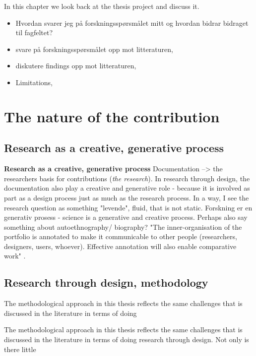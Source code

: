 In this chapter we look back at the thesis project and discuss it.

\begin{itemize}
    \item Hvordan svarer jeg på forskningsspørsmålet mitt og hvordan bidrar bidraget til fagfeltet?
    \item svare på forskningsspørsmålet opp mot litteraturen,
    \item diskutere findings opp mot litteraturen, 
    \item Limitations, 
\end{itemize}


\section{The nature of the contribution}



\subsection{Research as a creative, generative process}

\textbf{Research as a creative, generative process}
Documentation --> the researchers basis for contributions (\emph{the research}). In research through design, the documentation also play a creative and generative role - because it is involved as part as a design process just as much as the research process.
In a way, I see the research question as something "levende", fluid, that is not static. 
Forskning er en generativ prosess - science is a generative and creative process.
Perhaps also say something about autoethnography/ biography?
"The inner-organisation of the portfolio is annotated to make it communicable to other people (researchers, designers, users, whoever). Effective annotation will also enable comparative work" \autocite[p. 72]{bowers_annotated_2012}. 



\subsection{Research through design, methodology}

The methodological approach in this thesis reflects the same challenges that is discussed in the literature in terms of doing 

The methodological approach in this thesis reflects the same challenges that is discussed in the literature in terms of doing research through design. Not only is there little 

